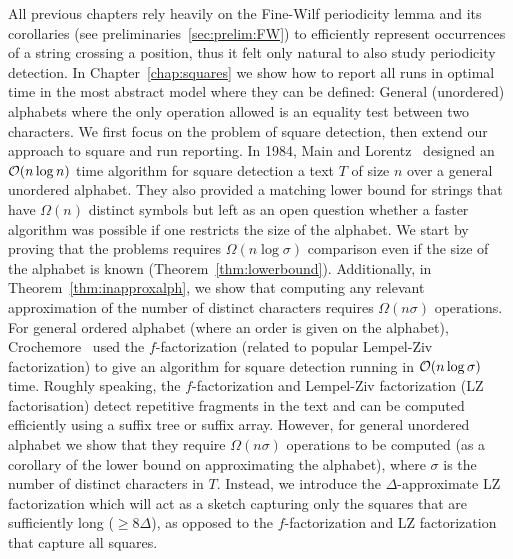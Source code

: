 All previous chapters rely heavily on the Fine-Wilf periodicity lemma and its corollaries (see preliminaries~\ref{sec:prelim:FW}) to efficiently represent occurrences of a string crossing a position, thus it felt only natural to also study periodicity detection. In Chapter~\ref{chap:squares} we show how to report all runs  in optimal time in the most abstract model where they can be defined: General (unordered) alphabets where the only operation allowed is an equality test between two characters. 
We first focus on the problem of square detection, then extend our approach to square and run reporting.
In 1984, Main and Lorentz~\cite{Main1984} designed an $\mathcal{O}(n\log n)$ time algorithm for square detection a text $T$ of size $n$ over a general unordered alphabet. They also provided a matching lower bound for strings that have $\Omega(n)$ distinct symbols but left as an open question whether a faster algorithm was possible if one restricts the size of the alphabet.
We start by proving that the problems requires $\Omega(n \log \sigma)$ comparison even if the size of the alphabet is known (Theorem~\ref{thm:lowerbound}). Additionally, in Theorem~\ref{thm:inapproxalph}, we show that computing any relevant approximation of the number of distinct characters requires $\Omega(n\sigma)$ operations.
For general ordered alphabet (where an order is given on the alphabet), Crochemore~\cite{Crochemore1986} used the $f$-factorization (related to popular Lempel-Ziv factorization) to give an algorithm for square detection running in $\mathcal{O}(n\log \sigma)$ time. Roughly speaking, the $f$-factorization and Lempel-Ziv factorization (LZ factorisation) detect repetitive fragments in the text and can be computed efficiently using a suffix tree or suffix array. However, for general unordered alphabet we show that they require $\Omega(n\sigma)$ operations to be computed (as a corollary of the lower bound on approximating the alphabet), where $\sigma$ is the number of distinct characters in $T$.
Instead, we introduce the $\Delta$-approximate LZ factorization which will act as a sketch capturing only the squares that are sufficiently long ($\geq 8\Delta$), as opposed to the $f$-factorization and LZ factorization that capture all squares.





